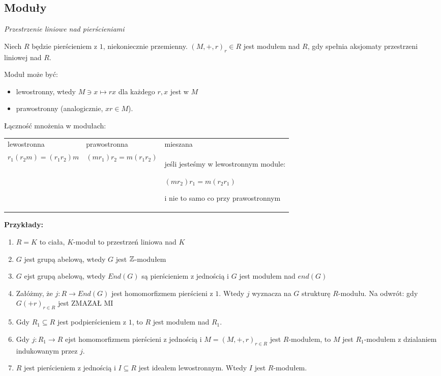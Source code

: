 \subsection{Moduły}

\emph{Przestrzenie liniowe nad pierścieniami}

\begin{definition}
    Niech $R$ będzie pierścieniem z $1$, niekoniecznie przemienny. $(M,+,r)_r\in R$ jest modułem nad $R$, gdy spełnia aksjomaty przestrzeni liniowej nad $R$.

    Moduł może być:
    \begin{itemize}
        \item[\PHtunny] lewostronny, wtedy $M\ni x\mapsto rx$ dla każdego $r,x$ jest w $M$
        \item[\PHtunny] prawostronny (analogicznie, $xr\in M$).
    \end{itemize}
\end{definition}

Łączność mnożenia w modułach:

\begin{tabular}{ p{5cm} p{5cm} p{5cm} }
lewostronna & prawostronna & mieszana \\

$r_1(r_2m)=(r_1r_2)m$

&

$(mr_1)r_2=m(r_1r_2)$

&

jeśli jesteśmy w lewostronnym module:

$(mr_2)r_1=m(r_2r_1)$

i nie to samo co przy prawostronnym
\end{tabular}

\textbf{Przykłady:}

\begin{enumerate}
    \item $R=K$ to ciała, $K$-moduł to przestrzeń liniowa nad $K$
    \item $G$ jest grupą abelową, wtedy $G$ jest $\mathbb{Z}$-modułem
    \item $G$ ejst grupą abelową, wtedy $End(G)$ są pierścieniem z jednością i $G$ jest modułem nad $end(G)$
    \item Załóżmy, że $j:R\to End(G)$ jest homomorfizmem pierścieni z $1$. Wtedy $j$ wyznacza na $G$ strukturę $R$-modułu. Na odwrót: gdy $G(+r)_{r\in R}$ jest {\large\color{orange}ZMAZAŁ MI}
    \item Gdy $R_1\subseteq R$ jest podpierścieniem z $1$, to $R$ jest modułem nad $R_1$.
    \item Gdy $j:R_1\to R$ ejst homomorfizmem pierścieni z jednością i $M=(M,+,r)_{r\in R}$ jest $R$-modułem, to $M$ jest $R_1$-modułem z dzialaniem indukowanym przez $j$.
    \item $R$ jest pierścieniem z jednością i $I\subseteq R$ jest ideałem lewostronnym. Wtedy $I$ jest $R$-modułem.
\end{enumerate}

